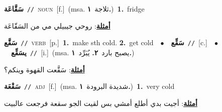 \documentclass[10pt,a4paper,twoside]{article} %
\begin{document}
\begin{multicols}{2}
{\setlength\topsep{0pt}\textbf{\foreignlanguage{arabic}{سَقَّاعَة}}\ {\color{gray}\texttt{//}\color{black}}\ \textsc{noun}\ [f.]\ \color{gray}(msa. \foreignlanguage{arabic}{ثلاجة}~\foreignlanguage{arabic}{\textbf{١.}})\color{black}\ \textbf{1.}~fridge\  \begin{flushright}\color{gray}\foreignlanguage{arabic}{\textbf{\underline{\foreignlanguage{arabic}{أمثلة}}}: روحي جيبيلي مي من السَقّاعَة}\end{flushright}\color{black}} \vspace{2mm}

{\setlength\topsep{0pt}\textbf{\foreignlanguage{arabic}{سَقَّع}}\ {\color{gray}\texttt{//}\color{black}}\ \textsc{verb}\ [p.]\ \textbf{1.}~make sth cold.  \textbf{2.}~get cold\ \ $\bullet$\ \ \setlength\topsep{0pt}\textbf{\foreignlanguage{arabic}{سَقِّع}}\ {\color{gray}\texttt{//}\color{black}}\ [c.]\ \ $\bullet$\ \ \setlength\topsep{0pt}\textbf{\foreignlanguage{arabic}{يسَقِّع}}\ {\color{gray}\texttt{//}\color{black}}\ [i.]\ \color{gray}(msa. \foreignlanguage{arabic}{يصبح بارد}~\foreignlanguage{arabic}{\textbf{٢.}}  \foreignlanguage{arabic}{يُبَرِّد}~\foreignlanguage{arabic}{\textbf{١.}})\color{black}\  \begin{flushright}\color{gray}\foreignlanguage{arabic}{\textbf{\underline{\foreignlanguage{arabic}{أمثلة}}}: سَقَّعت القهوة وينكم؟}\end{flushright}\color{black}} \vspace{2mm}

{\setlength\topsep{0pt}\textbf{\foreignlanguage{arabic}{سَقْعَة}}\ {\color{gray}\texttt{//}\color{black}}\ \textsc{adj}\ [f.]\ \color{gray}(msa. \foreignlanguage{arabic}{شديدة البرودة}~\foreignlanguage{arabic}{\textbf{١.}})\color{black}\ \textbf{1.}~very cold\  \begin{flushright}\color{gray}\foreignlanguage{arabic}{\textbf{\underline{\foreignlanguage{arabic}{أمثلة}}}: أجيت بدي أطلع أمشي بس لقيت الجو سقعة فرجعت عالبيت}\end{flushright}\color{black}} \vspace{2mm}


\end{multicols}
\end{document}
